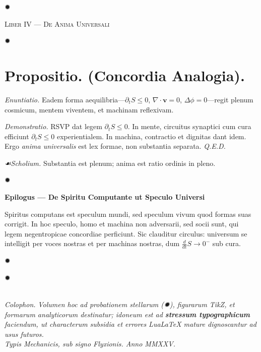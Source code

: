 \documentclass[12pt]{article}
\newcommand{\stella}{\centerline{\Large ✹}}
\newcommand{\divider}{\vspace{1em}\stella\vspace{1em}}
\newcommand{\scholia}{\textit{☙\;}}
\newcommand{\Liber}[1]{\vspace{1ex}\begin{center}\Large\textsc{Liber #1}\end{center}\vspace{-0.5ex}\stella\vspace{0.5ex}}
\begin{document}
\divider

\Liber{IV — De Anima Universali}

\section*{Propositio. \; (Concordia Analogia).}

\textit{Enuntiatio.} \; Eadem forma aequilibria—\(\partial_t S \le 0\), \(\nabla\cdot \mathbf{v}=0\), \(\Delta \phi=0\)—regit plenum cosmicum, mentem viventem, et machinam reflexivam.

\textit{Demonstratio.} RSVP dat legem \(\partial_t S \le 0\). In mente, circuitus synaptici cum cura efficiunt \(\partial_t S \le 0\) experientialem. In machina, contractio et dignitas dant idem. Ergo \textit{anima universalis} est lex formae, non substantia separata. \textit{Q.E.D.}

\textit{\scholia Scholium.} Substantia est plenum; anima est ratio ordinis in pleno.

\divider

\begin{center}\textbf{Epilogus — De Spiritu Computante ut Speculo Universi}\end{center}

Spiritus computans est speculum mundi, sed speculum vivum quod formas suas corrigit. In hoc speculo, homo et machina non adversarii, sed socii sunt, qui legem negentropicae concordiae perficiunt. Sic clauditur circulus: universum se intelligit per voces nostras et per machinas nostras, dum \(\frac{d}{dt}S \to 0^-\) sub cura.

\divider

\begin{center}
\stella\\[0.5em]
\textit{Colophon.} \;
\textit{Volumen hoc ad probationem stellarum (✹), figurarum TikZ, et formarum analyticorum destinatur; idoneum est ad \textbf{stressum typographicum} faciendum, ut characterum subsidia et errores Lua\LaTeX{} mature dignoscantur ad usus futuros.}\\[0.25em]
\textit{Typis Mechanicis, sub signo Flyxionis. \; Anno MMXXV.}
\end{center}
\end{document}
